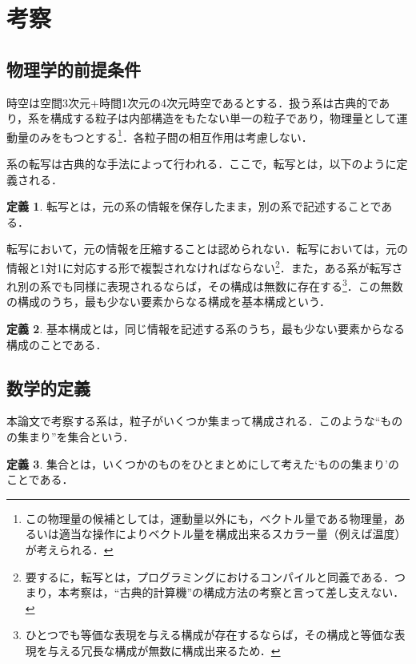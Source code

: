 \documentclass[10pt, a5paper, twoside]{jsarticle}
\theoremstyle{definition}
\newtheorem{dfn}{定義}
\begin{document}
	\section{考察}

		\subsection{物理学的前提条件}

			時空は空間3次元$+$時間1次元の4次元時空であるとする．扱う系は古典的であり，系を構成する粒子は内部構造をもたない単一の粒子であり，物理量として運動量のみをもつとする\footnote{この物理量の候補としては，運動量以外にも，ベクトル量である物理量，あるいは適当な操作によりベクトル量を構成出来るスカラー量（例えば温度）が考えられる．}．各粒子間の相互作用は考慮しない．

			系の転写は古典的な手法によって行われる．ここで，転写とは，以下のように定義される．

			\begin{dfn}
			
				転写とは，元の系の情報を保存したまま，別の系で記述することである．
			
			\end{dfn}

			転写において，元の情報を圧縮することは認められない．転写においては，元の情報と1対1に対応する形で複製されなければならない\footnote{要するに，転写とは，プログラミングにおけるコンパイルと同義である．つまり，本考察は，“古典的計算機”の構成方法の考察と言って差し支えない．}．また，ある系が転写され別の系でも同様に表現されるならば，その構成は無数に存在する\footnote{ひとつでも等価な表現を与える構成が存在するならば，その構成と等価な表現を与える冗長な構成が無数に構成出来るため．}．この無数の構成のうち，最も少ない要素からなる構成を基本構成という．

			\begin{dfn}

				基本構成とは，同じ情報を記述する系のうち，最も少ない要素からなる構成のことである．
			
			\end{dfn}

		\subsection{数学的定義}

			本論文で考察する系は，粒子がいくつか集まって構成される．このような“ものの集まり”を集合という．

			\begin{dfn}
				
				集合とは，いくつかのものをひとまとめにして考えた‘ものの集まり’のことである\cite{matsu}．

			\end{dfn}
\end{document}
